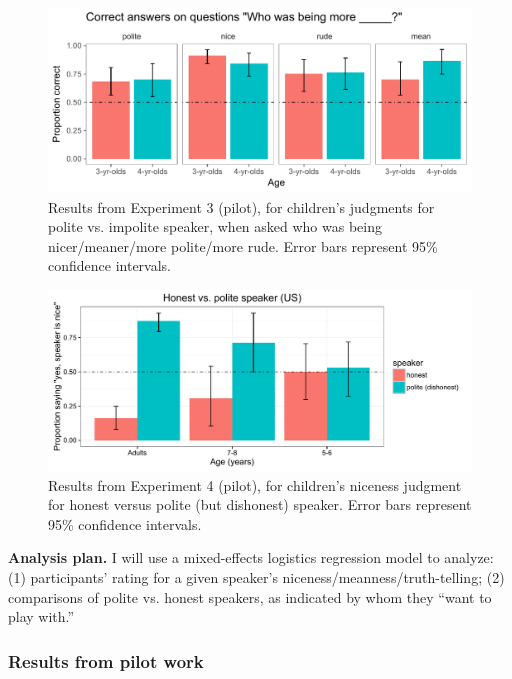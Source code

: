 \begin{figure}[t]
\begin{centering}
\includegraphics[width=\textwidth]{figures/youngchild.pdf}
\caption{\label{fig:expt3} Results from Experiment 3 (pilot), for children's judgments for polite vs. impolite speaker, when asked who was being nicer/meaner/more polite/more rude. Error bars represent 95\% confidence intervals.
}
\end{centering}
\end{figure}


\begin{figure}[h]
\begin{centering}
\includegraphics[width=\textwidth]{figures/exp3.pdf}
\caption{\label{fig:expt4} Results from Experiment 4 (pilot), for children's niceness judgment for honest versus polite (but dishonest) speaker. Error bars represent 95\% confidence intervals.}
\end{centering}
\end{figure}




{\bf Analysis plan.} I will use a mixed-effects logistics regression model to analyze: (1) participants' rating for a given speaker's niceness/meanness/truth-telling; (2) comparisons of polite vs. honest speakers, as indicated by whom they ``want to play with.''

\subsubsection{Results from pilot work}

